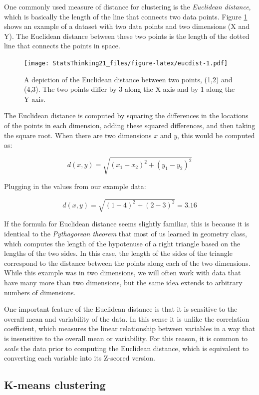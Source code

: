 \documentclass[
  12pt,
]{book}
\begin{document}
One commonly used measure of distance for clustering is the \emph{Euclidean distance}, which is basically the length of the line that connects two data points. Figure \ref{fig:eucdist} shows an example of a dataset with two data points and two dimensions (X and Y). The Euclidean distance between these two points is the length of the dotted line that connects the points in space.

\begin{figure}
\centering
\texttt{[image: StatsThinking21\_files/figure-latex/eucdist-1.pdf]}
\caption{\label{fig:eucdist}A depiction of the Euclidean distance between two points, (1,2) and (4,3). The two points differ by 3 along the X axis and by 1 along the Y axis.}
\end{figure}

The Euclidean distance is computed by squaring the differences in the locations of the points in each dimension, adding these squared differences, and then taking the square root. When there are two dimensions \(x\) and \(y\), this would be computed as:

\[
d(x, y) = \sqrt{(x_1 - x_2)^2 + (y_1 - y_2)^2}
\]

Plugging in the values from our example data:

\[
d(x, y) = \sqrt{(1 - 4)^2 + (2 - 3)^2} = 3.16
\]

If the formula for Euclidean distance seems slightly familiar, this is because it is identical to the \emph{Pythagorean theorem} that most of us learned in geometry class, which computes the length of the hypotenuse of a right triangle based on the lengths of the two sides. In this case, the length of the sides of the triangle correspond to the distance between the points along each of the two dimensions. While this example was in two dimensions, we will often work with data that have many more than two dimensions, but the same idea extends to arbitrary numbers of dimensions.

One important feature of the Euclidean distance is that it is sensitive to the overall mean and variability of the data. In this sense it is unlike the correlation coefficient, which measures the linear relationship between variables in a way that is insensitive to the overall mean or variability. For this reason, it is common to \emph{scale} the data prior to computing the Euclidean distance, which is equivalent to converting each variable into its Z-scored version.

\hypertarget{k-means-clustering}{%
\subsection{K-means clustering}\label{k-means-clustering}}
\end{document}
